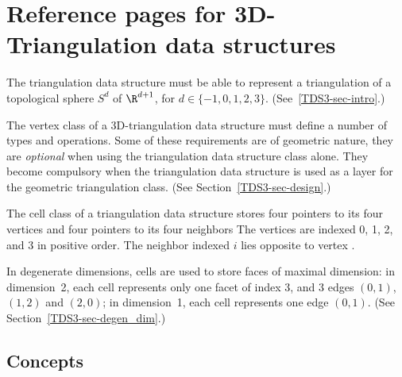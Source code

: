 \clearpage
\section{Reference pages for 3D-Triangulation data structures}

The triangulation data structure must be able to represent a
triangulation of a topological sphere $S^d$ of $\R^{d+1}$, for 
$d \in \{-1,0,1,2,3\}$. (See~\ref{TDS3-sec-intro}.)

The vertex class of a 3D-triangulation data structure must define
a number of types and operations. Some of these
requirements are of geometric nature, they are \textit{optional}
when using the triangulation data structure class alone. They become
compulsory when the triangulation data structure is used as a layer
for the geometric triangulation class. (See Section~\ref{TDS3-sec-design}.)

The cell class of a triangulation data structure stores
four pointers to its four vertices and four pointers to its four
neighbors The vertices are indexed 0, 1, 2, and 3 in positive order.
The neighbor indexed $i$ lies opposite to vertex .

In degenerate dimensions, cells are used to store faces of maximal
dimension: in dimension~2, each cell represents only one
facet of index 3, and 3 edges $(0,1)$, $(1,2)$ and $(2,0)$; in
dimension~1, each cell represents one edge $(0,1)$. (See 
Section~\ref{TDS3-sec-degen_dim}.) 

\subsection*{Concepts}


\\

\\

